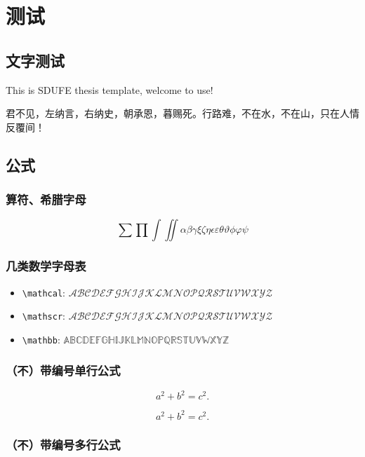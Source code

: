 \documentclass{sdufe-thesis}
\begin{document}
\tableofcontents

\mainmatter

\chapter{测试}

\section{文字测试}

This is SDUFE thesis template, welcome to use!

君不见，左纳言，右纳史，朝承恩，暮赐死。行路难，不在水，不在山，只在人情反覆间！

\section{公式}

\subsection{算符、希腊字母}

\[\sum\prod\int\iint\alpha\beta\gamma\xi\zeta\eta\epsilon\varepsilon\theta\vartheta
  \phi\varphi\psi\]


\subsection{几类数学字母表}

\begin{itemize}
  \item \verb|\mathcal|: $\mathcal{ABCDEFGHIJKLMNOPQRSTUVWXYZ}$
  \item \verb|\mathscr|: $\mathscr{ABCDEFGHIJKLMNOPQRSTUVWXYZ}$
  \item \verb|\mathbb|: $\mathbb{ABCDEFGHIJKLMNOPQRSTUVWXYZ}$
\end{itemize}


\subsection{（不）带编号单行公式}

\begin{equation}
  a^2 + b^2 = c^2.
\end{equation}

\[ a^2 + b^2 = c^2.\]

\subsection{（不）带编号多行公式}
\end{document}
